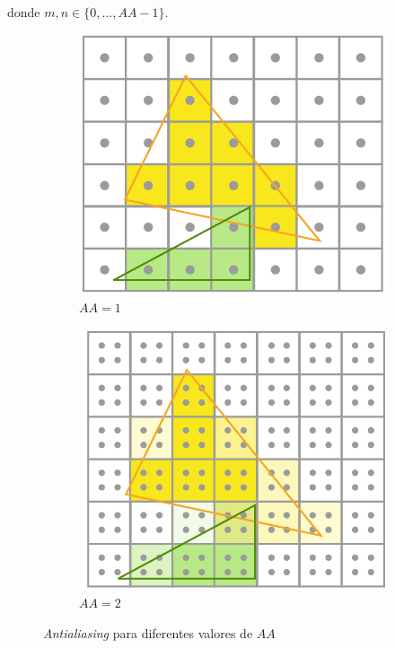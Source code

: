donde $m,n\in \{0,\dots, AA-1\}$.
\begin{figure}[!h]
    \centering
    \begin{subfigure}[b]{0.4\textwidth}
        \centering
        \includegraphics[width=\textwidth]{Plantilla-TFG-master/img/grid1.png}
        \caption{$AA = 1$}
    \end{subfigure}
    \hspace{15pt}
    \begin{subfigure}[b]{0.4\textwidth}
        \centering
        \includegraphics[width=\textwidth]{Plantilla-TFG-master/img/grid2.png}
        \caption{$AA = 2$}
    \end{subfigure}
    \hfill
     \caption{\textit{Antialiasing} para diferentes valores de $AA$}
\end{figure}

